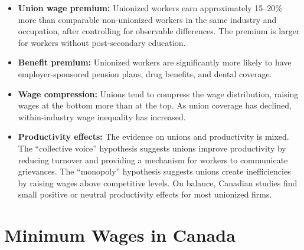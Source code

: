 \begin{itemize}
  \item \textbf{Union wage premium:} Unionized workers earn approximately
        15--20\% more than comparable non-unionized workers in the same
        industry and occupation, after controlling for observable differences.
        The premium is larger for workers without post-secondary education.
  \item \textbf{Benefit premium:} Unionized workers are significantly more
        likely to have employer-sponsored pension plans, drug benefits, and
        dental coverage.
  \item \textbf{Wage compression:} Unions tend to compress the wage
        distribution, raising wages at the bottom more than at the top.
        As union coverage has declined, within-industry wage inequality
        has increased.
  \item \textbf{Productivity effects:} The evidence on unions and productivity
        is mixed. The ``collective voice'' hypothesis suggests unions improve
        productivity by reducing turnover and providing a mechanism for workers
        to communicate grievances. The ``monopoly'' hypothesis suggests unions
        create inefficiencies by raising wages above competitive levels.
        On balance, Canadian studies find small positive or neutral productivity
        effects for most unionized firms.
\end{itemize}

\section{Minimum Wages in Canada}
\label{sec:min_wage}

